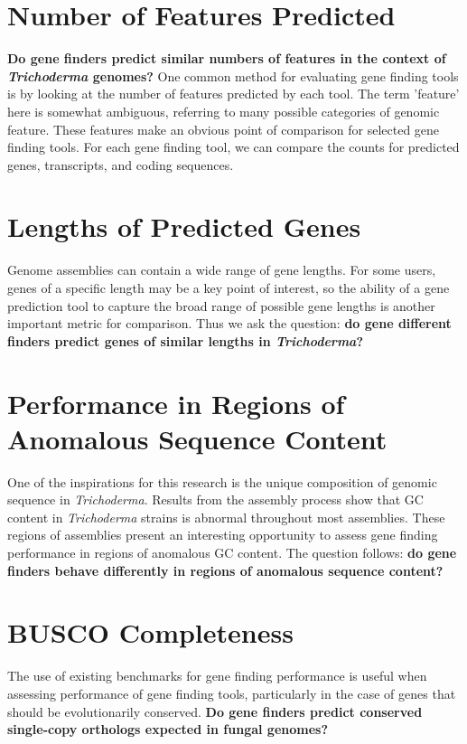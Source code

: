 \section{Number of Features Predicted}

\textbf{Do gene finders predict similar numbers of features in the
  context of \textit{Trichoderma} genomes?} One common method for
evaluating gene finding tools is by looking at the number of features
predicted by each tool. The term 'feature' here is somewhat ambiguous,
referring to many possible categories of genomic feature. These
features make an obvious point of comparison for selected gene finding
tools. For each gene finding tool, we can compare the counts for
predicted genes, transcripts, and coding sequences.

\section{Lengths of Predicted Genes}

Genome assemblies can contain a wide range of gene lengths. For some
users, genes of a specific length may be a key point of interest, so
the ability of a gene prediction tool to capture the broad range of
possible gene lengths is another important metric for comparison. Thus
we ask the question: \textbf{do gene different finders predict genes
  of similar lengths in \textit{Trichoderma}?}

\section{Performance in Regions of Anomalous Sequence Content}

One of the inspirations for this research is the unique composition of
genomic sequence in \textit{Trichoderma}. Results from the assembly
process show that GC content in \textit{Trichoderma} strains is
abnormal throughout most assemblies. These regions of assemblies
present an interesting opportunity to assess gene finding performance
in regions of anomalous GC content. The question follows: \textbf{do
  gene finders behave differently in regions of anomalous sequence
  content?}

\section{BUSCO Completeness}

The use of existing benchmarks for gene finding performance is useful
when assessing performance of gene finding tools, particularly in the
case of genes that should be evolutionarily conserved. \textbf{Do gene
  finders predict conserved single-copy orthologs expected in fungal
  genomes?}


